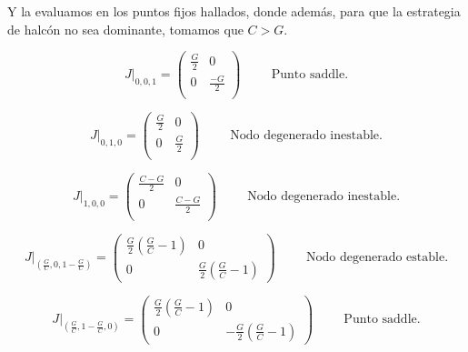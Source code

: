 \documentclass[letterpaper,12pt]{article}
\theoremstyle{plain}
\begin{document}
Y la evaluamos en los puntos fijos hallados, donde además, para que la estrategia de halcón no sea dominante, tomamos que $C > G$.

\begin{equation}
    J|_{0,0,1} =
\begin{pmatrix}
\frac{G}{2}  & 0 \\
0            &  \frac{-G}{2}  \\
\end{pmatrix} \hspace{1cm} \text{Punto saddle.}
\end{equation}

\begin{equation}
    J|_{0,1,0} =
\begin{pmatrix}
\frac{G}{2}  & 0 \\
0            &  \frac{G}{2}  \\
\end{pmatrix} \hspace{1cm} \text{Nodo degenerado inestable.}
\end{equation}

\begin{equation}
    J|_{1,0,0} =
\begin{pmatrix}
\frac{C-G}{2}  & 0 \\
0            &  \frac{C-G}{2}  \\
\end{pmatrix} \hspace{1cm} \text{Nodo degenerado inestable.}
\end{equation}

\begin{equation}
    J |_{\left(\frac{G}{C},0,1-\frac{G}{C}\right)} =
    \begin{pmatrix}
        \frac{G}{2} \left( \frac{G}{C} -1 \right)  & 0 \\[4pt]
        0       & \frac{G}{2} \left( \frac{G}{C} -1 \right)
    \end{pmatrix} \hspace{1cm} \text{Nodo degenerado estable.}
\end{equation}
    
\begin{equation}
J |_{\left(\frac{G}{C},1-\frac{G}{C},0\right)} =
\begin{pmatrix}
    \frac{G}{2} \left( \frac{G}{C} -1 \right)  & 0 \\[4pt]
    0       & -\frac{G}{2} \left( \frac{G}{C} -1 \right)
\end{pmatrix}
\hspace{1cm} \text{Punto saddle.}
\end{equation}
\end{document}
